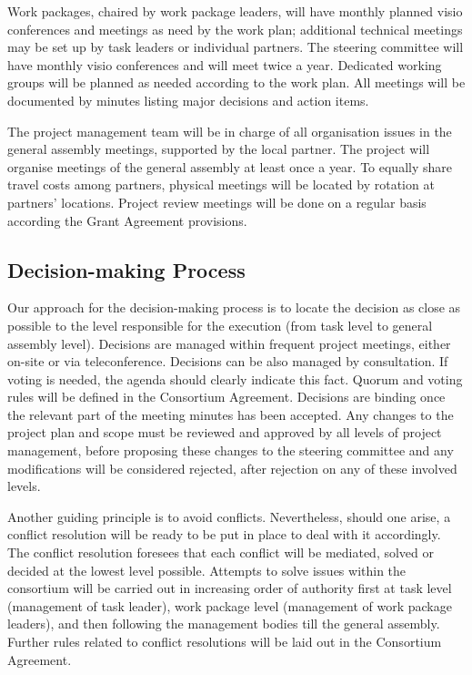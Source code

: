 Work packages, chaired by work package leaders, will have monthly
planned visio conferences and meetings as need by the work plan;
additional technical meetings may be set up by task leaders or
individual partners. The steering committee will have monthly visio
conferences and will meet twice a year. Dedicated working groups will
be planned as needed according to the work plan.  All meetings will be
documented by minutes listing major decisions and action items.

The project management team will be in charge of all organisation
issues in the general assembly meetings, supported by the local
partner. The project will organise meetings of the general assembly at
least once a year. To equally share travel costs among partners,
physical meetings will be located by rotation at partners’
locations. Project review meetings will be done on a regular basis
according the Grant Agreement provisions.

\subsection{Decision-making Process}

Our approach for the decision-making process is to locate the decision
as close as possible to the level responsible for the execution (from
task level to general assembly level). Decisions are managed within
frequent project meetings, either on-site or via
teleconference. Decisions can be also managed by consultation. If
voting is needed, the agenda should clearly indicate this fact. Quorum
and voting rules will be defined in the Consortium
Agreement. Decisions are binding once the relevant part of the meeting
minutes has been accepted. Any changes to the project plan and scope
must be reviewed and approved by all levels of project management,
before proposing these changes to the steering committee and any
modifications will be considered rejected, after rejection on any of
these involved levels.

Another guiding principle is to avoid conflicts. Nevertheless, should
one arise, a conflict resolution will be ready to be put in place to
deal with it accordingly. The conflict resolution foresees that each
conflict will be mediated, solved or decided at the lowest level
possible. Attempts to solve issues within the consortium will be
carried out in increasing order of authority first at task level
(management of task leader), work package level (management of work
package leaders), and then following the management bodies till the
general assembly. Further rules related to conflict resolutions will
be laid out in the Consortium Agreement.

